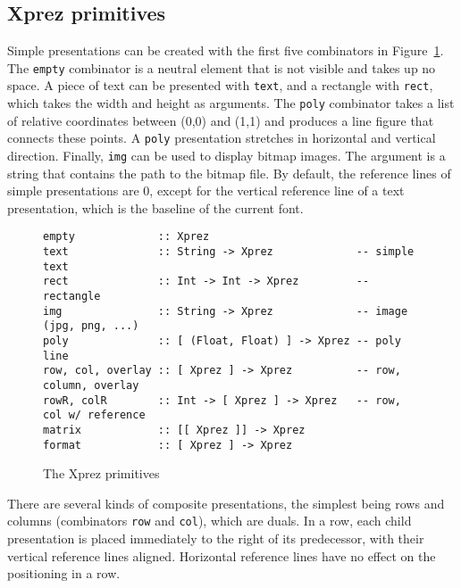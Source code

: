 %																
\subsection{{\sc Xprez} primitives} \label{sect:primitives}

Simple presentations can be created with the first five combinators in Figure~\ref{xprezprim}. The \texttt{empty} combinator is a neutral element that is not visible and takes up no space. A piece of text can be presented with \texttt{text}, and a rectangle with \texttt{rect}, which takes the width and height as arguments. The \texttt{poly} combinator takes a list of relative coordinates between (0,0) and (1,1) and produces a line figure that connects these points. A \texttt{poly} presentation stretches in horizontal and vertical direction. Finally, \texttt{img} can be used to display bitmap images. The argument is a string that contains the path to the bitmap file. By default, the reference lines of simple presentations are 0, except for the vertical reference line of a text presentation, which is the baseline of the current font.

\begin{figure}
\begin{small}
\begin{center}
\begin{small}
\begin{verbatim}
empty             :: Xprez
text              :: String -> Xprez             -- simple text
rect              :: Int -> Int -> Xprez         -- rectangle
img               :: String -> Xprez             -- image (jpg, png, ...)
poly              :: [ (Float, Float) ] -> Xprez -- poly line
row, col, overlay :: [ Xprez ] -> Xprez          -- row, column, overlay
rowR, colR        :: Int -> [ Xprez ] -> Xprez   -- row, col w/ reference
matrix            :: [[ Xprez ]] -> Xprez
format            :: [ Xprez ] -> Xprez
\end{verbatim}
\end{small}
\caption{The {\sc Xprez} primitives} \label{xprezprim} 
\end{center}
\end{small}
\end{figure}

There are several kinds of composite presentations, the simplest being rows and columns (combinators \texttt{row} and \texttt{col}), which are duals. In a row, each child presentation is placed immediately to the right of its predecessor, with their vertical reference lines aligned. Horizontal reference lines have no effect on the positioning in a row.

